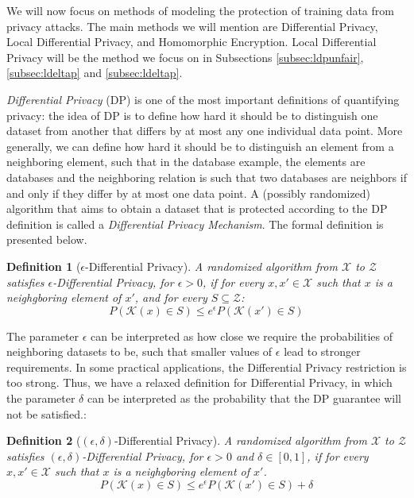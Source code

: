 \documentclass[conference]{IEEEtran}
\newtheorem{definition}{Definition}
\begin{document}
We will now focus on methods of modeling the protection of training data from privacy attacks. The main methods we will mention are Differential Privacy, Local Differential Privacy, and Homomorphic Encryption. Local Differential Privacy will be the method we focus on in Subsections \ref{subsec:ldpunfair}, \ref{subsec:ldeltap} and \ref{subsec:ldeltap}.

\emph{Differential Privacy} (DP) is one of the most important definitions of quantifying privacy: the idea of DP is to define how hard it should be to distinguish one dataset from another that differs by at most any one individual data point. More generally, we can define how hard it should be to distinguish an element from a neighboring element, such that in the database example, the elements are databases and the neighboring relation is such that two databases are neighbors if and only if they differ by at most one data point. A (possibly randomized) algorithm that aims to obtain a dataset that is protected according to the DP definition is called a \emph{Differential Privacy Mechanism}. The formal definition is presented below. 

\begin{definition}[$\epsilon$-Differential Privacy]\label{def:epsilonLDP} A randomized algorithm from $\mathcal{X}$ to $\mathcal{Z}$ satisfies $\epsilon$-Differential Privacy, for $\epsilon > 0$, if for every $x,x' \in \mathcal{X}$ such that $x$ is a neighgboring element of $x'$, and for every $S \subseteq \mathcal{Z}$:
$$P(\mathcal{K}(x) \in S) \leq e^\epsilon P(\mathcal{K}(x')\in S)$$
\end{definition}

The parameter $\epsilon$ can be interpreted as how close we require the probabilities of neighboring datasets to be, such that smaller values of $\epsilon$ lead to stronger requirements. In some practical applications, the Differential Privacy restriction is too strong. Thus, we have a relaxed definition for Differential Privacy, in which the parameter $\delta$ can be interpreted as the probability that the DP guarantee will not be satisfied.:

\begin{definition}[$(\epsilon,\delta)$-Differential Privacy]\label{def:edLDP} A randomized algorithm from $\mathcal{X}$ to $\mathcal{Z}$ satisfies $(\epsilon,\delta)$-Differential Privacy, for $\epsilon > 0$ and $\delta \in [0,1]$, if for every $x,x' \in \mathcal{X}$ such that $x$ is a neighgboring element of $x'$.
$$P(\mathcal{K}(x) \in S) \leq e^\epsilon P(\mathcal{K}(x')\in S)+\delta$$
\end{definition}
\end{document}
